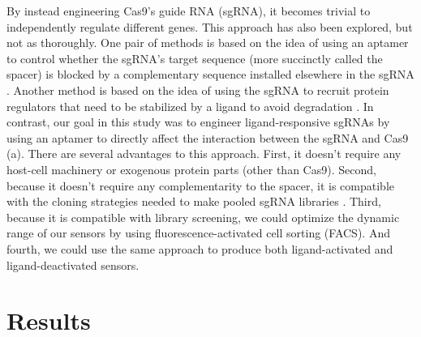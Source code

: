 \documentclass[10pt,oneside]{article}
\begin{document}
% 
% 
% 
%
By instead engineering Cas9's guide RNA (sgRNA), it becomes trivial to independently regulate different genes.  This approach has also been explored, but not as thoroughly.  One pair of methods is based on the idea of using an aptamer to control whether the sgRNA's  target sequence (more succinctly called the spacer) is blocked by a complementary sequence installed elsewhere in the sgRNA \autocite{liu2016,tang2017}.  Another method is based on the idea of using the sgRNA to recruit protein regulators that need to be stabilized by a ligand to avoid degradation \autocite{maji2017}.  In contrast, our goal in this study was to engineer ligand-responsive sgRNAs by using an aptamer to directly affect the interaction between the sgRNA and Cas9 (a).  There are several advantages to this approach.  First, it doesn't require any host-cell machinery or exogenous protein parts (other than Cas9).  Second, because it doesn't require any complementarity to the spacer, it is compatible with the cloning strategies needed to make pooled sgRNA libraries \autocite{gilbert2014}.  Third, because it is compatible with library screening, we could optimize the dynamic range of our sensors by using fluorescence-activated cell sorting (FACS).  And fourth, we could use the same approach to produce both ligand-activated and ligand-deactivated sensors.

\section{Results}



\end{document}
